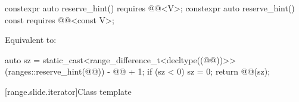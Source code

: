 %
\begin{itemdecl}
constexpr auto reserve_hint() requires @@<V>;
constexpr auto reserve_hint() const requires @@<const V>;
\end{itemdecl}

\begin{itemdescr}
\pnum
\effects
Equivalent to:
\begin{codeblock}
auto sz = static_cast<range_difference_t<decltype((@@))>>(ranges::reserve_hint(@@)) -
                                                             @@ + 1;
if (sz < 0) sz = 0;
return @@(sz);
\end{codeblock}
\end{itemdescr}

[range.slide.iterator]{Class template }

